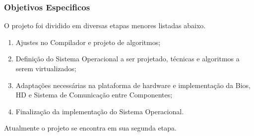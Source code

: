 \subsubsection{Objetivos Especificos}

O projeto foi dividido em diversas etapas menores listadas abaixo.

\begin{enumerate}
	\item Ajustes no Compilador e projeto de algoritmos;

	\item Definição do Sistema Operacional a ser projetado, técnicas e algoritmos a serem virtualizados;
	
	\item Adaptações necessárias na plataforma de hardware e implementação da Bios, HD e Sistema de Comunicação entre Componentes;
	
	\item Finalização da implementação do Sistema Operacional.
	
\end{enumerate} 

Atualmente o projeto se encontra em sua segunda etapa.

\clearpage